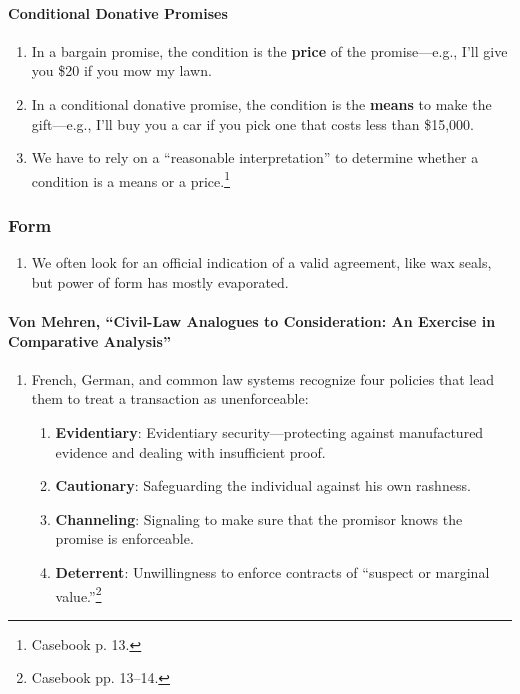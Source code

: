 \paragraph{Conditional Donative Promises}

\begin{enumerate}
    \item In a bargain promise, the condition is the \textbf{price} of the 
    promise---e.g., I'll give you \$20 if you mow my lawn.
    \item In a conditional donative promise, the condition is the 
    \textbf{means} to make the gift---e.g., I'll buy you a car if you pick one 
    that costs less than \$15,000.  \item We have to rely on a ``reasonable 
    interpretation'' to determine whether a condition is a means or a 
    price.\footnote{Casebook p. 13.}
\end{enumerate}

\subsubsection{Form}

\begin{enumerate}
    \item We often look for an official indication of a valid 
    agreement, like wax seals, but power of form has mostly evaporated.
\end{enumerate}

\paragraph{Von Mehren, ``Civil-Law Analogues to Consideration: An Exercise 
in Comparative Analysis''}

\begin{enumerate}
    \item French, German, and common law systems recognize four policies that 
    lead them to treat a transaction as unenforceable:
    \begin{enumerate}
        \item \textbf{Evidentiary}: Evidentiary security---protecting against 
        manufactured evidence and dealing with insufficient proof.
        \item \textbf{Cautionary}: Safeguarding the individual against his own 
        rashness.
        \item \textbf{Channeling}: Signaling to make sure that the promisor 
        knows the promise is enforceable.
        \item \textbf{Deterrent}: Unwillingness to enforce contracts of 
        ``suspect or marginal value.''\footnote{Casebook pp. 13--14.}
    \end{enumerate}
\end{enumerate}

